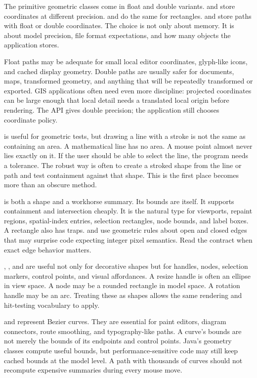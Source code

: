 The primitive geometric classes come in float and double variants.  and  store coordinates at different precision.  and  do the same for rectangles.  and  store paths with float or double coordinates. The choice is not only about memory. It is about model precision, file format expectations, and how many objects the application stores.

Float paths may be adequate for small local editor coordinates, glyph-like icons, and cached display geometry. Double paths are usually safer for documents, maps, transformed geometry, and anything that will be repeatedly transformed or exported. GIS applications often need even more discipline: projected coordinates can be large enough that local detail needs a translated local origin before rendering. The API gives double precision; the application still chooses coordinate policy.

 is useful for geometric tests, but drawing a line with a stroke is not the same as containing an area. A mathematical line has no area. A mouse point almost never lies exactly on it. If the user should be able to select the line, the program needs a tolerance. The robust way is often to create a stroked shape from the line or path and test containment against that shape. This is the first place  becomes more than an obscure method.

 is both a shape and a workhorse summary. Its bounds are itself. It supports containment and intersection cheaply. It is the natural type for viewports, repaint regions, spatial-index entries, selection rectangles, node bounds, and label boxes. A rectangle also has traps.  and  use geometric rules about open and closed edges that may surprise code expecting integer pixel semantics. Read the contract when exact edge behavior matters.

, , and  are useful not only for decorative shapes but for handles, nodes, selection markers, control points, and visual affordances. A resize handle is often an ellipse in view space. A node may be a rounded rectangle in model space. A rotation handle may be an arc. Treating these as shapes allows the same rendering and hit-testing vocabulary to apply.

 and  represent Bezier curves. They are essential for paint editors, diagram connectors, route smoothing, and typography-like paths. A curve's bounds are not merely the bounds of its endpoints and control points. Java's geometry classes compute useful bounds, but performance-sensitive code may still keep cached bounds at the model level. A path with thousands of curves should not recompute expensive summaries during every mouse move.

